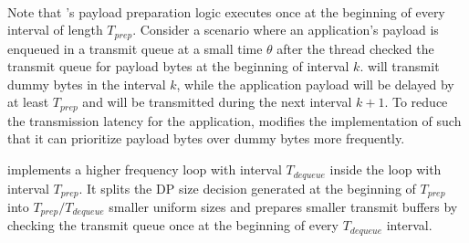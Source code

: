 \paragraph{}
Note that %
{\prepare}'s payload preparation logic executes once at the beginning of every
interval of length $T_{prep}$.
Consider a scenario where an application's payload is
enqueued in a transmit queue at a small time $\theta$ after
the {\prepare} thread checked the transmit queue for payload bytes at the
beginning of interval $k$.
{\prepare} will transmit dummy bytes in the interval $k$, while the
application payload will be delayed by at least $T_{prep}$ and will be
transmitted during the next interval ${k+1}$.
To reduce the transmission latency for the application, {\sys} modifies the
implementation of {\prepare} such that it can prioritize
payload bytes over dummy bytes more frequently.

{\prepare} implements a higher frequency loop with interval $T_{dequeue}$ inside
the
loop with interval $T_{prep}$. It splits the DP size decision generated at the
beginning of $T_{prep}$ into $T_{prep}/T_{dequeue}$ smaller uniform sizes and
prepares smaller transmit buffers by checking the transmit queue once at the
beginning of every $T_{dequeue}$ interval.
\fi

%

